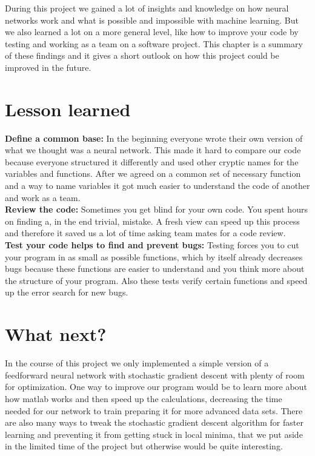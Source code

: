 During this project we gained a lot of insights and knowledge on how neural networks work and what is possible and impossible with machine learning.
But we also learned a lot on a more general level, like how to improve your code by testing and working as a team on a software project. This chapter is a summary of these findings and it gives a short outlook on how this project could be improved in the future.  
\section{Lesson learned}
\textbf{Define a common base:} In the beginning everyone wrote their own version of what we thought was a neural network. This made it hard to compare our code because everyone structured it differently and used other cryptic names for the variables and functions. After we agreed on a common set of necessary function and a way to name variables it got much easier to understand the code of another and work as a team. \\
\textbf{Review the code:} Sometimes you get blind for your own code. You spent hours on finding a, in the end trivial, mistake. A fresh view can speed up this process and therefore it saved us a lot of time asking team mates for a code review.  \\
\textbf{Test your code helps to find and prevent bugs:} Testing forces you to cut your program in as small as possible functions,  which by itself already decreases bugs because these functions are easier to understand and you think more about the structure of your program. Also these tests verify certain functions and speed up the error search for new bugs.

\section{What next?}
In the course of this project we only implemented a simple version of a feedforward neural network with stochastic gradient descent with plenty of room for optimization. One way to improve our program would be to learn more about how matlab works and then speed up the calculations, decreasing the time needed for our network to train preparing it for more advanced data sets.  There are also many ways to tweak the stochastic gradient descent algorithm for faster learning and preventing it from getting stuck in local minima, that we put  aside in the limited time of the project but otherwise would be quite interesting. 
